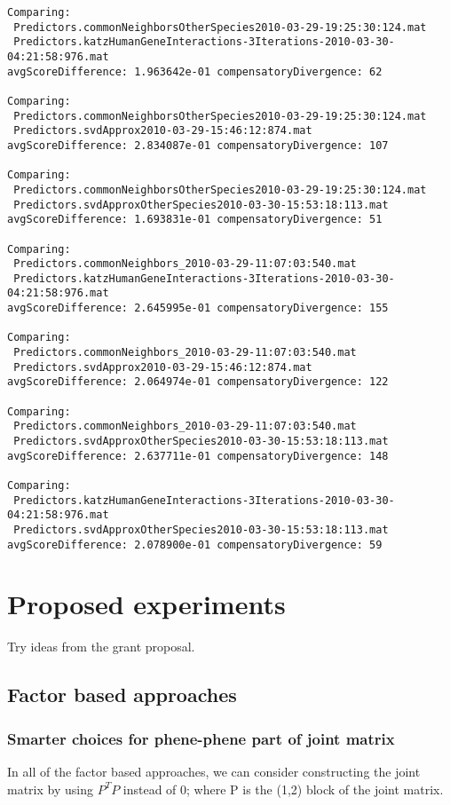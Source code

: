 \documentclass{report}
\begin{document}
\begin{lstlisting}
Comparing:
 Predictors.commonNeighborsOtherSpecies2010-03-29-19:25:30:124.mat
 Predictors.katzHumanGeneInteractions-3Iterations-2010-03-30-04:21:58:976.mat
avgScoreDifference: 1.963642e-01 compensatoryDivergence: 62

Comparing:
 Predictors.commonNeighborsOtherSpecies2010-03-29-19:25:30:124.mat
 Predictors.svdApprox2010-03-29-15:46:12:874.mat
avgScoreDifference: 2.834087e-01 compensatoryDivergence: 107

Comparing:
 Predictors.commonNeighborsOtherSpecies2010-03-29-19:25:30:124.mat
 Predictors.svdApproxOtherSpecies2010-03-30-15:53:18:113.mat
avgScoreDifference: 1.693831e-01 compensatoryDivergence: 51

Comparing:
 Predictors.commonNeighbors_2010-03-29-11:07:03:540.mat
 Predictors.katzHumanGeneInteractions-3Iterations-2010-03-30-04:21:58:976.mat
avgScoreDifference: 2.645995e-01 compensatoryDivergence: 155

Comparing:
 Predictors.commonNeighbors_2010-03-29-11:07:03:540.mat
 Predictors.svdApprox2010-03-29-15:46:12:874.mat
avgScoreDifference: 2.064974e-01 compensatoryDivergence: 122

Comparing:
 Predictors.commonNeighbors_2010-03-29-11:07:03:540.mat
 Predictors.svdApproxOtherSpecies2010-03-30-15:53:18:113.mat
avgScoreDifference: 2.637711e-01 compensatoryDivergence: 148

Comparing:
 Predictors.katzHumanGeneInteractions-3Iterations-2010-03-30-04:21:58:976.mat
 Predictors.svdApproxOtherSpecies2010-03-30-15:53:18:113.mat
avgScoreDifference: 2.078900e-01 compensatoryDivergence: 59
\end{lstlisting}

\section{Proposed experiments}
Try ideas from the grant proposal.

\subsection{Factor based approaches}
\subsubsection{Smarter choices for phene-phene part of joint matrix}
In all of the factor based approaches, we can consider constructing the joint matrix by using $P^{T}P$ instead of 0; where P is the (1,2) block of the joint matrix.
\end{document}
